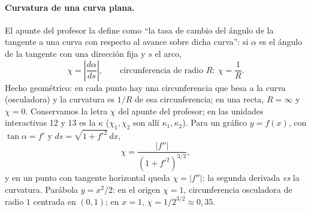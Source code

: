 \paragraph{Curvatura de una curva plana.} El apunte del profesor la define como ``la tasa
de cambio del ángulo de la tangente a una curva con respecto al avance sobre dicha
curva'': si \(\alpha\) es el ángulo de la tangente con una dirección fija y \(s\) el arco,
\[
  \chi=\left|\frac{d\alpha}{ds}\right|,\qquad \text{circunferencia de radio } R:\ \chi=\frac1R .
\]
Hecho geométrico: en cada punto hay una circunferencia que besa a la curva (osculadora) y
la curvatura es \(1/R\) de esa circunferencia; en una recta, \(R=\infty\) y \(\chi=0\). Conservamos la letra
\(\chi\) del apunte del profesor; en las unidades interactivas 12 y 13 es la \(\kappa\)
(\(\chi_1,\chi_2\) son allí \(\kappa_1,\kappa_2\)).
Para un gráfico \(y=f(x)\), con \(\tan\alpha=f'\) y \(ds=\sqrt{1+f'^2}\,dx\),
\[
  \chi=\frac{|f''|}{(1+f'^2)^{3/2}} ,
\]
y en un punto con tangente horizontal queda \(\chi=|f''|\): la segunda derivada \emph{es}
la curvatura. Parábola \(y=x^2/2\): en el origen \(\chi=1\), circunferencia osculadora de
radio \(1\) centrada en \((0,1)\); en \(x=1\), \(\chi=1/2^{3/2}\approx0{,}35\).

